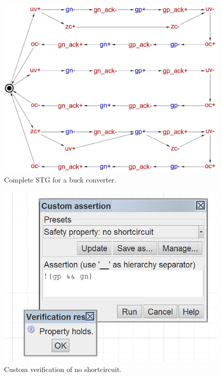 \documentclass[british, journal]{IEEEtran}
\begin{document}
\begin{figure}[t]
\begin{centering}
\includegraphics[scale=0.23]{Images/stg-buck-scenarios_merged}
\par\end{centering}
\begin{centering}
\protect\caption{\label{fig:buck STG}Complete STG for a buck converter.}
\par\end{centering}
\vspace{-3mm}
\end{figure}

\begin{figure}[h]
\begin{centering}
\includegraphics[scale=0.75]{Images/screenshot-custom-assertion}
\par\end{centering}
\begin{centering}
\protect\caption{\label{fig:custom_assertion}Custom verification of no
shortcircuit.}
\par\end{centering}
\vspace{-3mm}
\end{figure}
\end{document}
